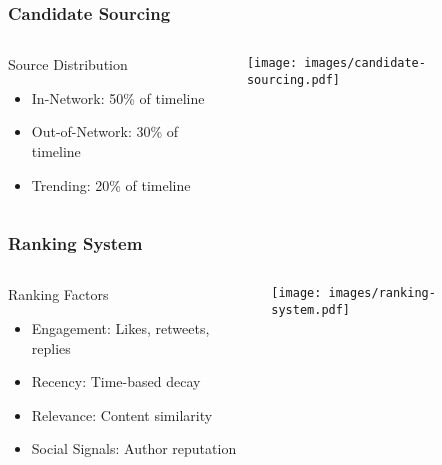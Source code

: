 \documentclass[aspectratio=169]{beamer}
\begin{document}
\begin{frame}
    \frametitle{Candidate Sourcing}
    \begin{columns}
        \begin{column}{0.6\textwidth}
            \begin{block}{Source Distribution}
                \begin{itemize}
                    \item In-Network: 50\% of timeline
                    \item Out-of-Network: 30\% of timeline
                    \item Trending: 20\% of timeline
                \end{itemize}
            \end{block}
        \end{column}
        \begin{column}{0.4\textwidth}
            \begin{center}
                \texttt{[image: images/candidate-sourcing.pdf]}
            \end{center}
        \end{column}
    \end{columns}
\end{frame}

\begin{frame}
    \frametitle{Ranking System}
    \begin{columns}
        \begin{column}{0.5\textwidth}
            \begin{block}{Ranking Factors}
                \begin{itemize}
                    \item Engagement: Likes, retweets, replies
                    \item Recency: Time-based decay
                    \item Relevance: Content similarity
                    \item Social Signals: Author reputation
                \end{itemize}
            \end{block}
        \end{column}
        \begin{column}{0.5\textwidth}
            \begin{center}
                \texttt{[image: images/ranking-system.pdf]}
            \end{center}
        \end{column}
    \end{columns}
\end{frame}
\end{document}
